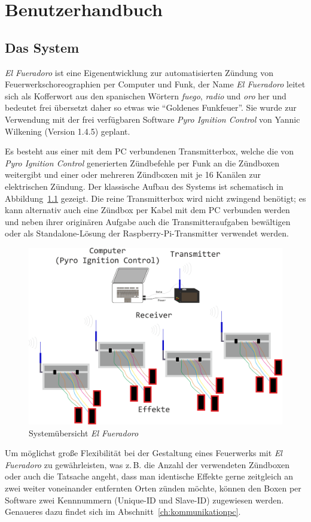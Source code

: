 \documentclass[paper=a4, parskip, numbers=noenddot, toc=listof, headsepline]{scrbook}
\newcommand{\pic}{\emph{Pyro Ignition Control}}
\newcommand{\anlage}{\emph{El Fueradoro}}
\begin{document}
		\tableofcontents
	\part{Benutzerhandbuch}

		\chapter{Das System}

			\anlage{} ist eine Eigenentwicklung zur automatisierten Zündung von Feuer\-werks\-choreo\-gra\-phien per Computer und Funk, der Name {\anlage} leitet sich als Kofferwort aus den spanischen Wörtern \emph{fuego}, \emph{radio} und \emph{oro} her und bedeutet frei übersetzt daher so etwas wie \enquote{Goldenes Funkfeuer}. Sie wurde zur Verwendung mit der frei verfügbaren Software {\pic} von Yannic Wilkening (Version 1.4.5) geplant.

			Es besteht aus einer mit dem PC verbundenen Transmitterbox, welche die von {\pic} generierten Zündbefehle per Funk an die Zündboxen weitergibt und einer oder mehreren Zündboxen mit je 16 Kanälen zur elektrischen Zündung. Der klassische Aufbau des Systems ist schematisch in Abbildung~\ref{fig:system} gezeigt. Die reine Transmitterbox wird nicht zwingend benötigt; es kann alternativ auch eine Zündbox per Kabel mit dem PC verbunden werden und neben ihrer originären Aufgabe auch die Transmitteraufgaben bewältigen oder als Standalone-Lösung der Raspberry-Pi-Transmitter verwendet werden.

			\begin{figure}
				\centering
				\includegraphics[width=.8\textwidth]{Bilder/system}
				\caption{Systemübersicht \anlage}
				\label{fig:system}
			\end{figure}

			Um möglichst große Flexibilität bei der Gestaltung eines Feuerwerks mit {\anlage} zu gewährleisten, was z.\,B. die Anzahl der verwendeten Zündboxen oder auch die Tatsache angeht, dass man identische Effekte gerne zeitgleich an zwei weiter voneinander entfernten Orten zünden möchte, können den Boxen per Software zwei Kennnummern (Unique-ID und Slave-ID) zugewiesen werden. Genaueres dazu findet sich im Abschnitt~\ref{ch:kommunikationpc}.
\end{document}
